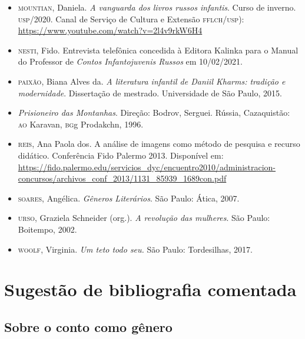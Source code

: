 \documentclass[11pt]{extarticle}
\begin{document}
\begin{itemize}
\item[]\textsc{mountian}, Daniela. \emph{A vanguarda dos livros russos infantis}. Curso
de inverno. \textsc{usp}/2020. Canal de Serviço de Cultura e Extensão \textsc{fflch}/\textsc{usp}):
\url{https://www.youtube.com/watch?v=2l4v9rkW6H4}

\item[]\textsc{nesti}, Fido. Entrevista telefônica concedida à Editora Kalinka para o
Manual do Professor de \emph{Contos Infantojuvenis Russos} em
10/02/2021.

\item[]\textsc{paixão}, Biana Alves da. \emph{A literatura infantil de Daniil Kharms:
tradição e modernidade}. Dissertação de mestrado. Universidade de São
Paulo, 2015.

\item[]\emph{Prisioneiro das Montanhas}. Direção: Bodrov, Serguei. Rússia,
Cazaquistão: \textsc{ao} Karavan, \textsc{bg}g Prodakchn, 1996.

\item[]\textsc{reis}, Ana Paola dos. A análise de imagens como método de pesquisa e
recurso didático. Conferência Fido Palermo 2013.
Disponível em:
\url{https://fido.palermo.edu/servicios_dyc/encuentro2010/administracion-concursos/archivos_conf_2013/1131_85939_1689con.pdf}

\item[]\textsc{soares}, Angélica. \emph{Gêneros Literários}. São Paulo: Ática, 2007.

\item[]\textsc{urso}, Graziela Schneider (org.). \emph{A revolução das mulheres}. São
Paulo: Boitempo, 2002.

\item[]\textsc{woolf}, Virginia. \emph{Um teto todo seu.} São Paulo: Tordesilhas, 2017.
\end{itemize}

\section{Sugestão de bibliografia comentada}

\subsection{Sobre o conto como gênero}
\end{document}
